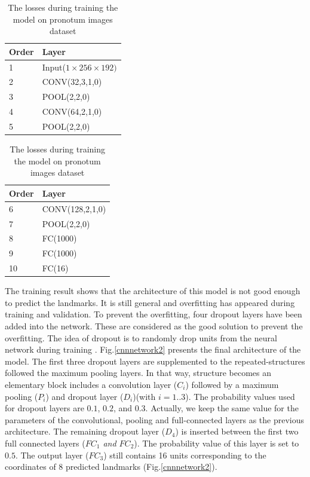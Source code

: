 \documentclass[10pt]{article}
\begin{document}
\begin{table}[h!]
	
	\begin{subtable}{.22\linewidth}
	\centering
	\begin{tabular}{l l }
	Order & Layer \\ \hline
	1 & Input($1\times256\times192)$ \\ \hline
	2 & CONV(32,3,1,0)\\ \hline
	3 & POOL(2,2,0)\\ \hline
	4 & CONV(64,2,1,0)\\ \hline
	5 & POOL(2,2,0)\\ \hline
	\end{tabular}
	\end{subtable}%
	\hspace{2.8cm}
	\begin{subtable}{.2\linewidth}
	\centering
	\begin{tabular}{l l }
	Order & Layer \\ \hline
	6 & CONV(128,2,1,0)\\ \hline
	7 & POOL(2,2,0)\\ \hline
	8 & FC(1000)\\ \hline
	9 & FC(1000)\\ \hline
	10 & FC(16)\\ \hline
	
	\end{tabular}
	\end{subtable}
	\caption{The losses during training the model on pronotum images dataset}
	\label{tblmodel1}
\end{table}
The training result shows that the architecture of this model is not good enough to predict the landmarks. It is still general and overfitting has appeared during training and validation.
To prevent the overfitting, four dropout layers have been added into the network. These are considered as the good solution to prevent the overfitting. The idea of dropout is to randomly drop units from the neural network during training \cite{srivastava2014dropout}. Fig.\ref{cnnnetwork2} presents the final architecture of the model. The first three dropout layers are supplemented to the repeated-structures followed the maximum pooling layers. In that way, structure becomes an elementary block includes a convolution layer (\textit{$C_i$}) followed by a maximum pooling (\textit{$P_i$}) and dropout layer (\textit{$D_i$})(with $i=1..3$). The probability values used for dropout layers are $0.1$, $0.2$, and $0.3$. Actually, we keep the same value for the parameters of the convolutional, pooling and full-connected layers as the previous architecture. 
The remaining dropout layer (\textit{$D_4$}) is inserted between the first
two full connected layers (\textit{$FC_1$ and $FC_2$}). The probability value of this layer
is set to $0.5$. The output layer (\textit{$FC_3$}) still contains 16 units corresponding to the coordinates of 8 predicted landmarks (Fig.\ref{cnnnetwork2}).
\end{document}
